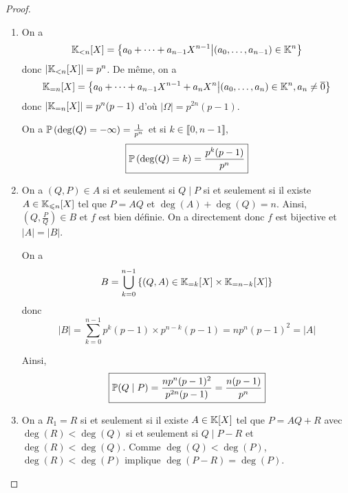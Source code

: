 \documentclass[12pt]{article}
\begin{document}
\begin{proof}
    \phantom{}
    \begin{enumerate}
        \item On a 
        \begin{equation}
            \K_{<n}[X]=\left\lbrace a_{0}+\dots+a_{n-1}X^{n-1}\middle|(a_{0},\dots,a_{n-1})\in\K^{n}\right\rbrace    
        \end{equation}
        donc $\left\lvert\K_{<n}[X]\right\rvert=p^{n}$. De même, on a 
        \begin{equation}
            \K_{=n}[X]=\left\lbrace a_{0}+\dots+a_{n-1}X^{n-1}+a_{n}X^{n}\middle|(a_{0},\dots,a_{n})\in\K^{n},a_{n}\neq\overline{0}\right\rbrace
        \end{equation}
        donc $\left\lvert\K_{=n}[X]\right\rvert=p^{n}(p-1)$ d'où $\left\lvert\Omega\right\rvert=p^{2n}(p-1)$.

        On a $\P\left(\deg(Q)=-\infty\right)=\frac{1}{p^{n}}$ et si $k\in\llbracket0,n-1\rrbracket$,
        \begin{equation}
            \boxed{\P\left(\deg(Q)=k\right)=\frac{p^{k}(p-1)}{p^{n}}}
        \end{equation}

        \item On a $(Q,P)\in A$ si et seulement si $Q\mid P$ si et seulement si il existe $A\in\K_{\leqslant n}[X]$ tel que $P=AQ$ et $\deg(A)+\deg(Q)=n$. Ainsi, $\left(Q,\frac{P}{Q}\right)\in B$ et $f$ est bien définie. On a directement
        donc $f$ est bijective et $\left\lvert A\right\rvert =\left\lvert B\right\rvert$.

        On a 
        \begin{equation}
            B=\bigcup_{k=0}^{n-1}\left\lbrace(Q,A)\in\K_{=k}[X]\times\K_{=n-k}[X]\right\rbrace
        \end{equation}
        donc 
        \begin{equation}
            \left\lvert B\right\rvert=\sum_{k=0}^{n-1}p^{k}(p-1)\times p^{n-k}(p-1)=np^{n}(p-1)^{2}=\left\lvert A\right\rvert
        \end{equation}

        Ainsi, 
        \begin{equation}
            \boxed{\P(Q\mid P)=\frac{np^{n}(p-1)^{2}}{p^{2n}(p-1)}=\frac{n(p-1)}{p^{n}}}
        \end{equation}

        \item On a $R_{1}=R$ si et seulement si il existe $A\in\K[X]$ tel que $P=AQ+R$ avec $\deg(R)<\deg(Q)$ si et seulement si $Q\mid P-R$ et $\deg(R)<\deg(Q)$. Comme $\deg(Q)<\deg(P)$, $\deg(R)<\deg(P)$ implique $\deg(P-R)=\deg(P)$.
        

\end{enumerate}
\end{proof}
\end{document}

